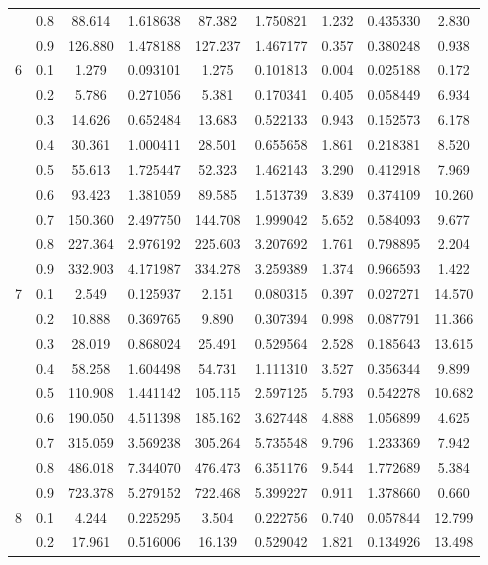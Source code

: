 \begin{longtable}{ | c | c || c | c | c | c | c | c | c | }
 & 0.8 & 88.614 & 1.618638 & 87.382 & 1.750821 & 1.232 & 0.435330 & 2.830 \\
 & 0.9 & 126.880 & 1.478188 & 127.237 & 1.467177 & 0.357 & 0.380248 & 0.938 \\
 \hline
\multirow{9}{*}{6} & 0.1 & 1.279 & 0.093101 & 1.275 & 0.101813 & 0.004 & 0.025188 & 0.172 \\
 & 0.2 & 5.786 & 0.271056 & 5.381 & 0.170341 & 0.405 & 0.058449 & 6.934 \\
 & 0.3 & 14.626 & 0.652484 & 13.683 & 0.522133 & 0.943 & 0.152573 & 6.178 \\
 & 0.4 & 30.361 & 1.000411 & 28.501 & 0.655658 & 1.861 & 0.218381 & 8.520 \\
 & 0.5 & 55.613 & 1.725447 & 52.323 & 1.462143 & 3.290 & 0.412918 & 7.969 \\
 & 0.6 & 93.423 & 1.381059 & 89.585 & 1.513739 & 3.839 & 0.374109 & 10.260 \\
 & 0.7 & 150.360 & 2.497750 & 144.708 & 1.999042 & 5.652 & 0.584093 & 9.677 \\
 & 0.8 & 227.364 & 2.976192 & 225.603 & 3.207692 & 1.761 & 0.798895 & 2.204 \\
 & 0.9 & 332.903 & 4.171987 & 334.278 & 3.259389 & 1.374 & 0.966593 & 1.422 \\
 \hline
\multirow{9}{*}{7} & 0.1 & 2.549 & 0.125937 & 2.151 & 0.080315 & 0.397 & 0.027271 & 14.570 \\
 & 0.2 & 10.888 & 0.369765 & 9.890 & 0.307394 & 0.998 & 0.087791 & 11.366 \\
 & 0.3 & 28.019 & 0.868024 & 25.491 & 0.529564 & 2.528 & 0.185643 & 13.615 \\
 & 0.4 & 58.258 & 1.604498 & 54.731 & 1.111310 & 3.527 & 0.356344 & 9.899 \\
 & 0.5 & 110.908 & 1.441142 & 105.115 & 2.597125 & 5.793 & 0.542278 & 10.682 \\
 & 0.6 & 190.050 & 4.511398 & 185.162 & 3.627448 & 4.888 & 1.056899 & 4.625 \\
 & 0.7 & 315.059 & 3.569238 & 305.264 & 5.735548 & 9.796 & 1.233369 & 7.942 \\
 & 0.8 & 486.018 & 7.344070 & 476.473 & 6.351176 & 9.544 & 1.772689 & 5.384 \\
 & 0.9 & 723.378 & 5.279152 & 722.468 & 5.399227 & 0.911 & 1.378660 & 0.660 \\
 \hline
\multirow{9}{*}{8} & 0.1 & 4.244 & 0.225295 & 3.504 & 0.222756 & 0.740 & 0.057844 & 12.799 \\
 & 0.2 & 17.961 & 0.516006 & 16.139 & 0.529042 & 1.821 & 0.134926 & 13.498 \\

\end{longtable}
